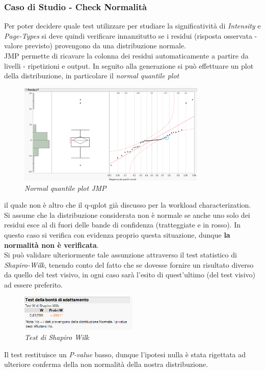 \subsubsection{Caso di Studio - Check Normalità}
Per poter decidere quale test utilizzare per studiare la significatività di \textit{Intensity} e \textit{Page-Types} si deve quindi verificare innanzitutto se i residui (risposta osservata - valore previsto) provengono da una distribuzione normale.
\\JMP permette di ricavare la colonna dei residui automaticamente a partire da livelli - ripetizioni e output. In seguito alla generazione si può effettuare un plot della distribuzione, in particolare il \textit{normal quantile plot}
\begin{figure}[H]
	\centering
	\includegraphics[width=0.8\textwidth]{img/hw4/qqplot_res.png}
	\caption{\textit{Normal quantile plot JMP}}
\end{figure}
il quale non è altro che il q-qplot già discusso per la workload characterization.
\\Si assume che la distribuzione considerata non è normale se anche uno solo dei residui esce al di fuori delle bande di confidenza (tratteggiate e in rosso). In questo caso si verifica con evidenza proprio questa situazione, dunque \textbf{la normalità non è verificata}.
\\Si può validare ulteriormente tale assunzione attraverso il test statistico di \textit{Shapiro-Wilk}, tenendo conto del fatto che se dovesse fornire un risultato diverso da quello del test visivo, in ogni caso sarà l'esito di quest'ultimo (del test visivo) ad essere preferito.
\begin{figure}[H]
	\centering
	\includegraphics[width=0.5\textwidth]{img/hw4/shapiro_wilch.png}
	\caption{\textit{Test di Shapiro Wilk}}
\end{figure}
Il test restituisce un \textit{P-value} basso, dunque l'ipotesi nulla è stata rigettata ad ulteriore conferma della non normalità della nostra distribuzione.
